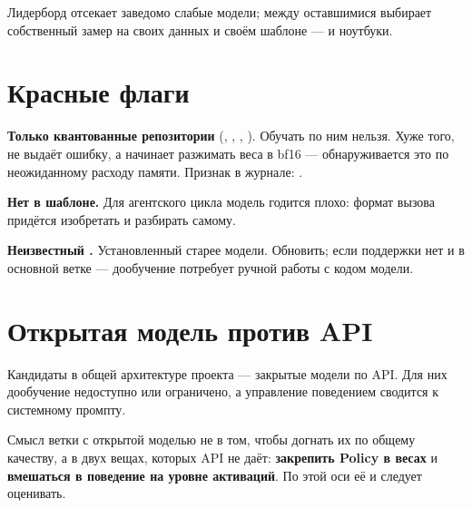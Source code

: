 \documentclass[11pt,a4paper]{article}
\begin{document}
Лидерборд отсекает заведомо слабые модели; между оставшимися выбирает
собственный замер на своих данных и своём шаблоне —
 и ноутбуки.

\section{Красные флаги}

\textbf{Только квантованные репозитории} (, , ,
). Обучать по ним нельзя. Хуже того,  не выдаёт
ошибку, а начинает разжимать веса в bf16 — обнаруживается это по
неожиданному расходу памяти. Признак в журнале: .

\textbf{Нет  в шаблоне.} Для агентского цикла модель годится
плохо: формат вызова придётся изобретать и разбирать самому.

\textbf{Неизвестный .} Установленный 
старее модели. Обновить; если поддержки нет и в основной ветке —
дообучение потребует ручной работы с кодом модели.

\section{Открытая модель против API}

Кандидаты в общей архитектуре проекта — закрытые модели по API. Для них
дообучение недоступно или ограничено, а управление поведением сводится
к системному промпту.

Смысл ветки с открытой моделью не в том, чтобы догнать их по общему
качеству, а в двух вещах, которых API не даёт: \textbf{закрепить Policy
в весах} и \textbf{вмешаться в поведение на уровне активаций}. По этой
оси её и следует оценивать.
\end{document}
